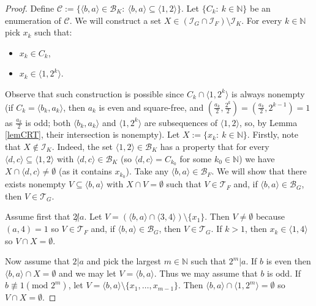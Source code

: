 \documentclass{amsart}
\theoremstyle{definition}
\newcommand{\N}{{\mathbb N}}
\newcommand{\I}{\mathcal I}
\newcommand{\T}{\mathcal{T}}
\newcommand{\B}{\mathcal{B}}
\newcommand{\modulo}{\textrm{mod }}
\newcommand{\arithseq}[2]{\langle#2, #1\rangle}
\begin{document}
\begin{proof}
Define $\mathcal{C} := \{\arithseq{a}{b}\in \B_K :\ \arithseq{a}{b}\subseteq \arithseq{2}{1}\}$. Let $\{C_k :\ k\in\N\}$ be an enumeration of $\mathcal{C}$.
We will construct a set $X \in (\I_G\cap \I_F) \setminus \I_K$. 
For every $k\in\N$ pick $x_k$ such that:
\begin{itemize}
	\item $x_k\in C_k$,
	\item $x_k\in \arithseq{2^k}{1}$.
\end{itemize}
Observe that such construction is possible since $C_k \cap \arithseq{2^k}{1}$ is always nonempty (if $C_k = \arithseq{a_k}{b_k}$, then $a_k$ is even and square-free, and $\left(\frac{a_k}{2},\frac{2^k}{2}\right)=\left(\frac{a_k}{2},2^{k-1}\right)=1$ as $\frac{a_k}{2}$ is odd; both $\arithseq{a_k}{b_k}$ and $\arithseq{2^k}{1}$ are subsequences of $\arithseq{2}{1}$, so, by Lemma \ref{lemCRT}, their intersection is nonempty). Let $X := \{x_k :\ k\in\N\}$.
Firstly, note that $X \notin \I_K$. Indeed, the set $\arithseq{2}{1}\in\B_K$ has a property that for every $\arithseq{c}{d}\subseteq \arithseq{2}{1}$ with $\arithseq{c}{d}\in \B_K$ (so $\arithseq{c}{d}=C_{k_0}$ for some $k_0\in\N$) we have $X\cap \arithseq{c}{d} \neq \emptyset$ (as it contains $x_{k_0}$).
  Take any $\arithseq{a}{b} \in \B_F$. We will show that there exists
nonempty $V \subseteq \arithseq{a}{b}$ with $X\cap V = \emptyset$ such
that $V\in \T_F$ and, if $\arithseq{a}{b}\in \B_G$, then $V\in\T_G$.

  Assume first that $2\not | a$. Let 
$V = (\arithseq{a}{b} \cap \arithseq{4}{3}) \setminus \{x_1\}$. 
Then $V \not= \emptyset$ because $(a,4) = 1$ so 
$V\in \T_F$ and, if $\arithseq{a}{b}\in \B_G$, then $V\in \T_G$.
If $k > 1$, then $x_k \in \arithseq{4}{1}$ so $V\cap X = \emptyset$.
  
  Now assume that $2|a$ and pick the largest $m\in \N$
such that $2^m|a$. If $b$ is even then $\arithseq{a}{b}\cap X = \emptyset$
and we may let $V = \arithseq{a}{b}$. Thus we may assume
that $b$ is odd. If $b\not\equiv 1(\modulo 2^m)$, let
$V = \arithseq{a}{b}\setminus \{x_1,\ldots, x_{m-1}\}$.
Then $\arithseq{a}{b}\cap \arithseq{2^m}{1} = \emptyset$ so $V\cap X = \emptyset$.


\end{proof}
\end{document}
